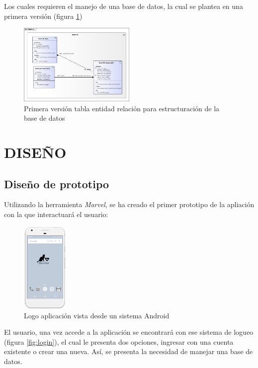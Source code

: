 \documentclass[letterpaper, 10 pt, conference]{ieeeconf}  %
\begin{document}
Los cuales requieren el manejo de una base de datos, la cual se plantea en una primera versi\'on (figura \ref{fig:entidades})

\begin{figure}
\centering
\includegraphics[width=0.5\textwidth]{bdvunoheartcat.png} \caption{Primera versi\'on tabla entidad relaci\'on para estructuraci\'on de la base de datos}
\label{fig:entidades}
\end{figure}


   
\section{DISE\~NO}

\subsection{Dise\~no de prototipo}

Utilizando la herramienta \textit{Marvel}, se ha creado el primer prototipo de la apliaci\'on con la que interactuar\'a el usuario:

\begin{figure}
\centering
\includegraphics[width=0.2\textwidth]{hc1.png}
\caption{Logo aplicaci\'on vista desde un sistema Android}
\label{fig:home}
\end{figure}

El usuario, una vez accede a la aplicaci\'on se encontrar\'a con ese sistema de logueo (figura \ref{fig:login}), el cual le presenta dos opciones, ingresar con una cuenta existente o crear una nueva. As\'i, se presenta la necesidad de manejar una base de datos.\\
\end{document}
